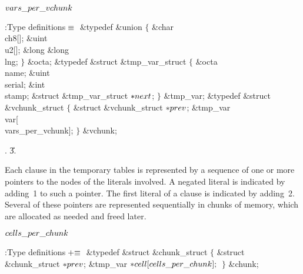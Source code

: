 \Y\B\4\D$\\{vars\_per\_vchunk}$ \5
\par
\Y\B\4:Type definitions\X${}\equiv{}$\6
\&{typedef} \&{union} ${}\{{}$\1\6
\&{char} \\{ch8}[];\6
\&{uint} \\{u2}[];\6
\&{long} \&{long} \\{lng};\2\6
${}\}{}$ \&{octa};\6
\&{typedef} \&{struct} \&{tmp\_var\_struct} ${}\{{}$\1\6
\&{octa} \\{name};\6
\&{uint} \\{serial};\6
\&{int} \\{stamp};\6
\&{struct} \&{tmp\_var\_struct} ${}{*}\\{next}{}$;\2%
\6
${}\}{}$ \&{tmp\_var};\7
\&{typedef} \&{struct} \&{vchunk\_struct} ${}\{{}$\1\6
\&{struct} \&{vchunk\_struct} ${}{*}\\{prev}{}$;\6
\&{tmp\_var} \\{var}[\\{vars\_per\_vchunk}];\2\6
${}\}{}$ \&{vchunk};\par
{}.
\U3.\fi

Each clause in the temporary tables is represented by a sequence of
one or more pointers to the  nodes of the literals involved.
A negated literal is indicated by adding~1 to such a pointer.
The first literal of a clause is indicated by adding~2.
Several of these pointers are represented sequentially in chunks
of memory, which are allocated as needed and freed later.

\Y\B\4\D$\\{cells\_per\_chunk}$ \5
\par
\Y\B\4:Type definitions\X${}\mathrel+\equiv{}$\6
\&{typedef} \&{struct} \&{chunk\_struct} ${}\{{}$\1\6
\&{struct} \&{chunk\_struct} ${}{*}\\{prev}{}$;\6
\&{tmp\_var} ${}{*}\\{cell}[\\{cells\_per\_chunk}];{}$\2\6
${}\}{}$ \&{chunk};\par
\fi

